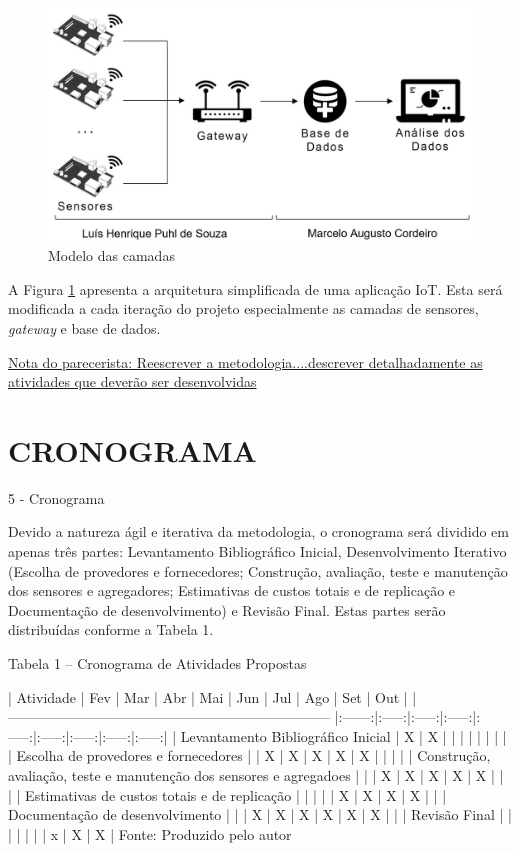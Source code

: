 \documentclass[
	12pt,				%
	openright,			%
	oneside,			%
	a4paper,			%
	chapter=TITLE,		%
	english,			%
	french,				%
	spanish,			%
	brazil				%
	]{abntex2}
\begin{document}
{\begin{figure}[htb]
	\caption{\label{fig:projeto}Modelo das camadas }
	\begin{center}
		\includegraphics[width=1\textwidth]{img/projeto.JPG}
	\end{center}
\end{figure}

A Figura \ref{fig:projeto} apresenta a arquitetura simplificada de uma aplicação
IoT. Esta será modificada a cada iteração do projeto especialmente as camadas de
sensores, \textit{gateway} e base de dados.

\underline{Nota do parecerista: Reescrever a metodologia....descrever
detalhadamente as atividades que deverão ser desenvolvidas}


\chapter{CRONOGRAMA}
\label{chap:CRONOGRAMA}


5 - Cronograma

Devido a natureza ágil e iterativa da metodologia, o cronograma será dividido em
apenas três partes: Levantamento Bibliográfico Inicial, Desenvolvimento
Iterativo (Escolha de provedores e fornecedores; Construção, avaliação, teste e
manutenção dos sensores e agregadores; Estimativas de custos totais e de
replicação e Documentação de desenvolvimento) e Revisão Final. Estas partes
serão distribuídas conforme a Tabela 1.

Tabela 1 – Cronograma de Atividades Propostas

| Atividade															 	| 	Fev	 | 	Mar	 | 	Abr	 | 	Mai	 | 	Jun	 | 	Jul	 | 	Ago	 | 	Set	 | 	Out  |
| --------------------------------------------------------------------- |:------:|:-----:|:-----:|:-----:|:-----:|:-----:|:-----:|:-----:|:-----:|
| Levantamento Bibliográfico Inicial									| 	X	 | 	X	 | 	 	 | 	 	 | 	 	 | 	 	 | 	 	 | 	 	 | 	     |
| Escolha de provedores e fornecedores									| 	 	 | 	X	 | 	X	 | 	X	 | 	X	 | 	X	 | 		 | 		 | 	     |
| Construção, avaliação, teste e manutenção dos sensores e agregadoes	| 	 	 | 		 | 	X	 | 	X	 | 	X	 | 	X	 | 	X	 | 		 | 	     |
| Estimativas de custos totais e de replicação							| 	 	 | 		 | 		 | 		 | 	X	 | 	X	 | 	X	 | 	X	 | 	     |
| Documentação de desenvolvimento										| 	 	 | 		 | 	X	 | 	X	 | 	X	 | 	X	 | 	X	 | 	X	 | 	     |
| Revisão Final															| 	 	 | 	 	 | 	 	 | 	 	 | 	 	 | 	 	 | 	x 	 | 	X	 | 	X    |
Fonte: Produzido pelo autor

}
\end{document}
